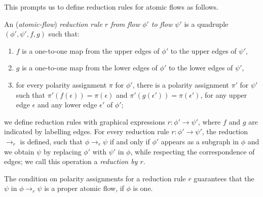 This prompts us to define reduction rules for atomic flows as follows.

\begin{definition}\label{definition:FlowReductionRule}
An (\emph{atomic-flow}) \emph{reduction rule $r$ from flow $\phi'$ to flow $\psi'$} is a quadruple $(\phi',\psi',f,g)$ such that:
\begin{enumerate}
\item $f$ is a one-to-one map from the upper edges of $\phi'$ to the upper edges of $\psi'$,
\item $g$ is a one-to-one map from the lower edges of $\phi'$ to the lower edges of $\psi'$,
\item for every polarity assignment $\pi$ for $\phi'$, there is a polarity assignment $\pi'$ for $\psi'$ such that $\pi'(f(\epsilon))=\pi(\epsilon)$ and $\pi'(g(\epsilon'))=\pi(\epsilon')$, for any upper edge $\epsilon$ and any lower edge $\epsilon'$ of $\phi'$;
\end{enumerate}
we define reduction rules with graphical expressions $r\colon\phi'\to\psi'$, where $f$ and $g$ are indicated by labelling edges. For every reduction rule $r\colon\phi'\to\psi'$, the reduction ${\to_r}$ is defined, such that $\phi\to_r\psi$ if and only if $\phi'$ appears as a subgraph in $\phi$ and we obtain $\psi$ by replacing $\phi'$ with $\psi'$ in $\phi$, while respecting the correspondence of edges; we call this operation a \emph{reduction by $r$}.
\end{definition}


\begin{remark}\label{remark:FlowReductionRuleProperFlow}
The condition on polarity assignments for a reduction rule $r$ guarantees that the $\psi$ in $\phi\to_r\psi$ is a proper atomic flow, if $\phi$ is one.
\end{remark}

